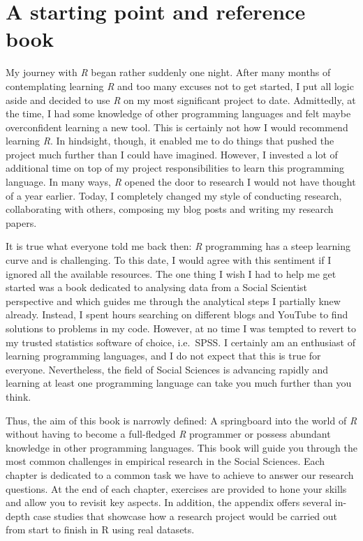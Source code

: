 \documentclass[
  letterpaper,
]{krantz}
\begin{document}
\section{A starting point and reference
book}\label{sec-a-starting-point-and-reference-book}

My journey with \emph{R} began rather suddenly one night. After many
months of contemplating learning \emph{R} and too many excuses not to
get started, I put all logic aside and decided to use \emph{R} on my
most significant project to date. Admittedly, at the time, I had some
knowledge of other programming languages and felt maybe overconfident
learning a new tool. This is certainly not how I would recommend
learning \emph{R}. In hindsight, though, it enabled me to do things that
pushed the project much further than I could have imagined. However, I
invested a lot of additional time on top of my project responsibilities
to learn this programming language. In many ways, \emph{R} opened the
door to research I would not have thought of a year earlier. Today, I
completely changed my style of conducting research, collaborating with
others, composing my blog posts and writing my research papers.

It is true what everyone told me back then: \emph{R} programming has a
steep learning curve and is challenging. To this date, I would agree
with this sentiment if I ignored all the available resources. The one
thing I wish I had to help me get started was a book dedicated to
analysing data from a Social Scientist perspective and which guides me
through the analytical steps I partially knew already. Instead, I spent
hours searching on different blogs and YouTube to find solutions to
problems in my code. However, at no time I was tempted to revert to my
trusted statistics software of choice, i.e.~SPSS. I certainly am an
enthusiast of learning programming languages, and I do not expect that
this is true for everyone. Nevertheless, the field of Social Sciences is
advancing rapidly and learning at least one programming language can
take you much further than you think.

Thus, the aim of this book is narrowly defined: A springboard into the
world of \emph{R} without having to become a full-fledged \emph{R}
programmer or possess abundant knowledge in other programming languages.
This book will guide you through the most common challenges in empirical
research in the Social Sciences. Each chapter is dedicated to a common
task we have to achieve to answer our research questions. At the end of
each chapter, exercises are provided to hone your skills and allow you
to revisit key aspects. In addition, the appendix offers several
in-depth case studies that showcase how a research project would be
carried out from start to finish in R using real datasets.
\end{document}
